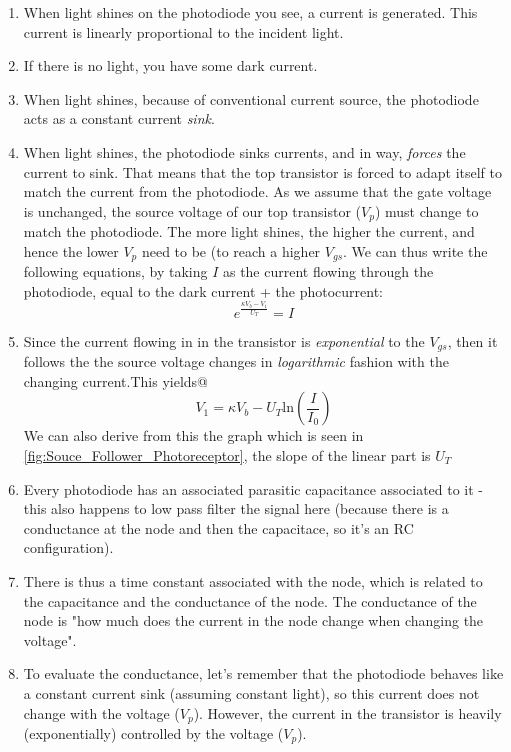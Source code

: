 \begin{enumerate}
    \item When light shines on the photodiode you see, a current is generated. This current is linearly proportional to the incident light.
    \item If there is no light, you have some dark current. 
    \item When light shines, because of conventional current source, the photodiode acts as a constant current \textit{sink}.
    \item When light shines, the photodiode sinks currents, and in way, \textit{forces} the current to sink. That means that the top transistor is forced to adapt itself to match the current from the photodiode. As we assume that the gate voltage is unchanged, the source voltage of our top transistor ($V_p$) must change to match the photodiode. The more light shines, the higher the current, and hence the lower $V_p$ need to be (to reach a higher $V_{gs}$. We can thus write the following equations, by taking $I$ as the current flowing through the photodiode, equal to the dark current + the photocurrent:
    \begin{equation}
        e^{\frac{\kappa V_b - V_1}{U_T}} = I
    \end{equation}
    \item Since the current flowing in  in the transistor is \textit{exponential} to the $V_{gs}$, then it follows the the source voltage changes in \textit{logarithmic} fashion with the changing current.This yields@
    \begin{equation}
        V_1 = \kappa V_b - U_T\mathrm{ln}(\frac{I}{I_0})
    \end{equation}
    We can also derive from this the graph which is seen in \ref{fig:Souce_Follower_Photoreceptor}, the slope of the linear part is $U_T$
    \item Every photodiode has an associated parasitic capacitance associated to it - this also happens to low pass filter the signal here (because there is a conductance at the node and then the capacitace, so it's an RC configuration). 
    \item There is thus a time constant associated with the node, which is related to the capacitance and the conductance of the node. The conductance of the node is "how much does the current in the node change when changing the voltage".
    \item To evaluate the conductance, let's remember that the photodiode behaves like a constant current sink (assuming constant light), so this current does not change with the voltage ($V_p$). However, the current in the transistor is heavily (exponentially) controlled by the voltage ($V_p$). 

\end{enumerate}
